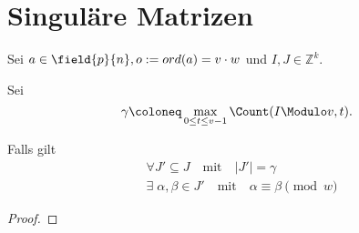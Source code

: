 \section{Singuläre Matrizen}

\begin{satz}
    Sei $a \in \field{p}{n}, o := ord(a) = v\cdot w$ und $I,J \in \mathbb{Z}^k$.
    
    Sei
    \begin{equation*}
        \gamma \coloneq  \max_{0\leq t\leq v-1} \Count(I \Modulo v,t).
    \end{equation*}
    
    Falls gilt 
    \begin{align*}
        & \forall J' \subseteq J \quad \text{mit} \quad |J'|= \gamma \\ 
        & \exists \; \alpha,\beta \in J' \quad \text{mit} \quad \alpha \equiv \beta \pmod w
    \end{align*}
\end{satz}

\begin{proof}
    
\end{proof}